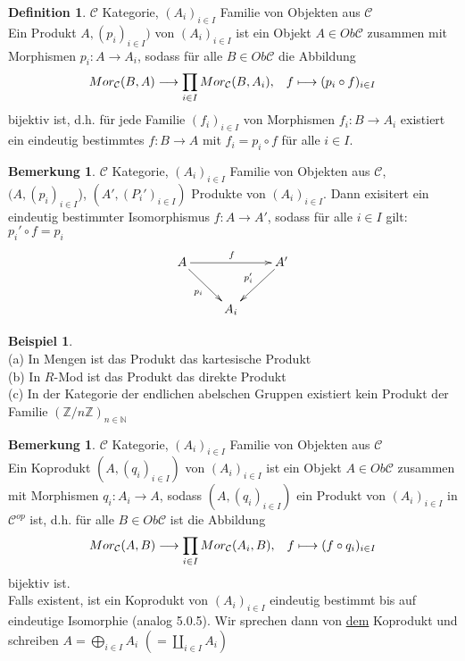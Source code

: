 \documentclass[10pt,a4paper,numbers=endperiod]{scrreprt}
\theoremstyle{definition}
\newtheorem{defi}[satz]{Definition}
\newtheorem{bem}[satz]{Bemerkung}
\newtheorem{bsp}[satz]{Beispiel}
\def\NN{{\mathbb N}}
\def\ZZ{{\mathbb Z}}
\begin{document}
\begin{defi}
	$\mathcal{C}$ Kategorie, $(A_i)_{i \in I}$ Familie von Objekten aus $\mathcal{C}$\\
	Ein Produkt $A, (p_i)_{i \in I})$ von $(A_i)_{i \in I}$ ist ein Objekt $A \in Ob \mathcal{C}$ zusammen mit Morphismen $p_i: A \to A_i$, sodass für alle $B \in Ob \mathcal{C}$ die Abbildung \begin{align*}
	 	Mor_\mathcal{C} (B, A) \longrightarrow \prod\limits_{i \in I} Mor_\mathcal{C} (B, A_i), \hspace*{3mm} f \longmapsto (p_i \circ f)_{i \in I}
	\end{align*}
	bijektiv ist, d.h. für jede Familie $(f_i)_{i \in I}$ von Morphismen $f_i: B \to A_i$ existiert ein eindeutig bestimmtes $f: B \to A$ mit $f_i = p_i \circ f$ für alle $i \in I$.
\end{defi}

\begin{bem}
	$\mathcal{C}$ Kategorie, $(A_i)_{i \in I}$ Familie von Objekten aus $\mathcal{C}$, $(A, (p_i)_{i \in I}$), $(A', (P_i')_{i \in I})$ Produkte von $(A_i)_{i \in I}$. Dann exisitert ein eindeutig bestimmter Isomorphismus $f: A \to A'$, sodass für alle $i \in I$ gilt: $p_i' \circ f = p_i$ \begin{align*}
		\begin{xy}
			\xymatrix{
			A \ar[rr]^f \ar[dr]_{p_i} & & A' \ar[dl]_{p_i'}\\
			& A_i &
		}
		\end{xy}
	\end{align*}
\end{bem}

\begin{bsp}
	$ $\\
	(a) In Mengen ist das Produkt das kartesische Produkt\\
	(b) In $R$-Mod ist das Produkt das direkte Produkt\\
	(c) In der Kategorie der endlichen abelschen Gruppen existiert kein Produkt der Familie $(\ZZ/n \ZZ)_{n \in \NN}$
\end{bsp}

\begin{bem}
	$\mathcal{C}$ Kategorie, $(A_i)_{i \in I}$ Familie von Objekten aus $\mathcal{C}$\\
	Ein Koprodukt $(A, (q_i)_{i \in I})$ von $(A_i)_{i \in I}$ ist ein Objekt $A \in Ob \mathcal{C}$ zusammen mit Morphismen $q_i: A_i \to A$, sodass $(A, (q_i)_{i \in I})$ ein Produkt von $(A_i)_{i \in I}$ in $\mathcal{C}^{op}$ ist, d.h. für alle $B \in Ob \mathcal{C}$ ist die Abbildung \begin{align*}
		Mor_\mathcal{C} (A, B) \longrightarrow \prod\limits_{i \in I} Mor_\mathcal{C} (A_i, B), \hspace*{3mm} f \longmapsto (f \circ q_i)_{i \in I}
	\end{align*}
	bijektiv ist.\\
	Falls existent, ist ein Koprodukt von $(A_i)_{i \in I}$ eindeutig bestimmt bis auf eindeutige Isomorphie (analog 5.0.5). Wir sprechen dann von \underline{dem} Koprodukt und schreiben $A = \bigoplus\limits_{i \in I} A_i$ $(= \coprod\limits_{i \in I} A_i )$
\end{bem}
\end{document}
